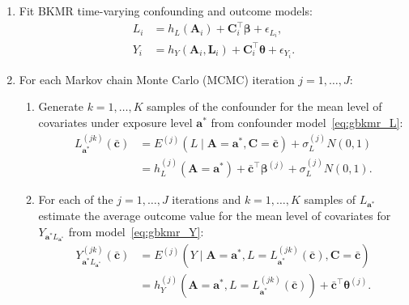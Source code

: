 \begin{enumerate}
    \item Fit BKMR time-varying confounding and outcome models:
    \begin{align}
        L_i &= h_L(\mathbf{A}_i) + \mathbf{C}_i^\top \boldsymbol{\beta} + \epsilon_{L_i},  \label{eq:gbkmr_L} \\
        Y_i &= h_Y(\mathbf{A}_i, \mathbf{L}_i) + \mathbf{C}_i^\top \boldsymbol{\theta} + \epsilon_{Y_i}.  \label{eq:gbkmr_Y}
    \end{align}

    \item For each Markov chain Monte Carlo (MCMC) iteration $j = 1, \ldots, J$:
    \begin{enumerate}
        \item Generate $k = 1, \ldots, K$ samples of the confounder for the mean level of covariates under exposure level $\mathbf{a}^*$ from confounder model~\eqref{eq:gbkmr_L}:
        \begin{equation*}
        \begin{aligned}
            L_{\mathbf{a}^*}^{(jk)}(\bar{\mathbf{c}}) &= E^{(j)}\!\left(L \mid \mathbf{A} = \mathbf{a}^*, \mathbf{C} = \bar{\mathbf{c}}\right) + \sigma_L^{(j)} N(0, 1) \\
            &= h_L^{(j)}(\mathbf{A} = \mathbf{a}^*) + \bar{\mathbf{c}}^\top \boldsymbol{\beta}^{(j)} + \sigma_L^{(j)} N(0, 1).
        \end{aligned}
        \end{equation*}

        \item For each of the $j = 1, \ldots, J$ iterations and $k = 1, \ldots, K$ samples of $L_{\mathbf{a}^*}$ estimate the average outcome value for the mean level of covariates for $Y_{\mathbf{a}^* L_{\mathbf{a}^*}}$ from model~\eqref{eq:gbkmr_Y}:
        \begin{equation*}
        \begin{aligned}
            Y_{\mathbf{a}^* L_{\mathbf{a}^*}}^{(jk)}(\bar{\mathbf{c}}) &= E^{(j)}\!\left(Y \mid \mathbf{A} = \mathbf{a}^*, L = L_{\mathbf{a}^*}^{(jk)}(\bar{\mathbf{c}}), \mathbf{C} = \bar{\mathbf{c}}\right) \\
            &= h_Y^{(j)}\!\left(\mathbf{A} = \mathbf{a}^*, L = L_{\mathbf{a}^*}^{(jk)}(\bar{\mathbf{c}})\right) + \bar{\mathbf{c}}^\top \boldsymbol{\theta}^{(j)}.
        \end{aligned}
        \end{equation*}


\end{enumerate}
\end{enumerate}
